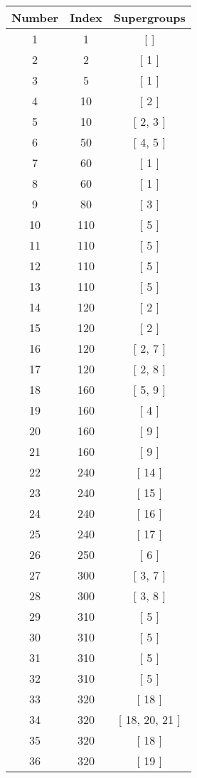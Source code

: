 \begin{center}
\begin{longtable}[H]{|| c c c ||}
\hline
Number &  Index &  Supergroups
\\\hline
1 & 1 & [  ]
\\\hline
2 & 2 & [ 1 ]
\\\hline
3 & 5 & [ 1 ]
\\\hline
4 & 10 & [ 2 ]
\\\hline
5 & 10 & [ 2, 3 ]
\\\hline
6 & 50 & [ 4, 5 ]
\\\hline
7 & 60 & [ 1 ]
\\\hline
8 & 60 & [ 1 ]
\\\hline
9 & 80 & [ 3 ]
\\\hline
10 & 110 & [ 5 ]
\\\hline
11 & 110 & [ 5 ]
\\\hline
12 & 110 & [ 5 ]
\\\hline
13 & 110 & [ 5 ]
\\\hline
14 & 120 & [ 2 ]
\\\hline
15 & 120 & [ 2 ]
\\\hline
16 & 120 & [ 2, 7 ]
\\\hline
17 & 120 & [ 2, 8 ]
\\\hline
18 & 160 & [ 5, 9 ]
\\\hline
19 & 160 & [ 4 ]
\\\hline
20 & 160 & [ 9 ]
\\\hline
21 & 160 & [ 9 ]
\\\hline
22 & 240 & [ 14 ]
\\\hline
23 & 240 & [ 15 ]
\\\hline
24 & 240 & [ 16 ]
\\\hline
25 & 240 & [ 17 ]
\\\hline
26 & 250 & [ 6 ]
\\\hline
27 & 300 & [ 3, 7 ]
\\\hline
28 & 300 & [ 3, 8 ]
\\\hline
29 & 310 & [ 5 ]
\\\hline
30 & 310 & [ 5 ]
\\\hline
31 & 310 & [ 5 ]
\\\hline
32 & 310 & [ 5 ]
\\\hline
33 & 320 & [ 18 ]
\\\hline
34 & 320 & [ 18, 20, 21 ]
\\\hline
35 & 320 & [ 18 ]
\\\hline
36 & 320 & [ 19 ]
\\\hline

\end{longtable}
\end{center}
